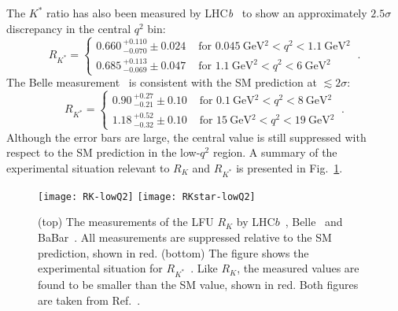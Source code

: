 The $K^{*}$ ratio has also been measured by LHC\textit{b}~\cite{Aaij:2017vbb} to
show an approximately $2.5 \sigma$ discrepancy in the central $q^{2}$ bin:
\begin{equation}
  \label{eq:ch1-RKstar-lhcb}
    R_{K^*} = \begin{cases}
     0.660\,_{-0.070}^{+0.110}\pm 0.024 & \text{ for $\SI{0.045}{\GeV^{2}} < q^2 < \SI{1.1}{\GeV^{2}}$} \\
    0.685\,_{-0.069}^{+0.113}\pm 0.047 & \text{ for $\SI{1.1}{\GeV^{2}} < q^2 < \SI{6}{\GeV^{2}}$}
  \end{cases} \ .
\end{equation}
The Belle measurement~\cite{Abdesselam:2019wac} is consistent with the SM
prediction at $\lesssim 2\sigma$:
\begin{equation}
  \label{eq:ch1-RKstar-belle}
    R_{K^*} = \begin{cases}
     0.90\,_{-0.21}^{+0.27} \pm 0.10 & \text{ for $\SI{0.1}{\GeV^{2}} < q^2 < \SI{8}{\GeV^{2}}$} \\
    1.18\,_{-0.32}^{+0.52} \pm 0.10 & \text{ for $\SI{15}{\GeV^{2}} < q^2 < \SI{19}{\GeV^{2}}$}
  \end{cases} \ .
\end{equation}
Although the error bars are large, the central value is still suppressed with
respect to the SM prediction in the low-$q^{2}$ region. A summary of the
experimental situation relevant to $R_{K}$ and $R_{K^{*}}$ is presented in
Fig.~\ref{fig:ch1-rkrkstar-summary}.

\begin{figure}
  \centering
  \texttt{[image: RK-lowQ2]}
  \texttt{[image: RKstar-lowQ2]}
  \caption[(top) The measurements of the LFU $R_{K}$ by
  LHC$b$~\cite{Aaij:2019wad}, Belle~\cite{Abdesselam:2019lab} and
  BaBar~\cite{Lees:2012tva}. (bottom) The figure shows the experimental
  situation for $R_{K^{*}}$~\cite{Lees:2012tva, Abdesselam:2019wac,
    Aaij:2017vbb}.]{(top) The measurements of the LFU $R_{K}$ by
    LHC$b$~\cite{Aaij:2019wad}, Belle~\cite{Abdesselam:2019lab} and
    BaBar~\cite{Lees:2012tva}. All measurements are suppressed relative to the
    SM prediction, shown in red. (bottom) The figure shows the experimental
    situation for $R_{K^{*}}$~\cite{Lees:2012tva, Abdesselam:2019wac,
      Aaij:2017vbb}. Like $R_{K}$, the measured values are found to be smaller
    than the SM value, shown in red. Both figures are taken from
    Ref.~\cite{Koppenburg:2016rji}.}
  \label{fig:ch1-rkrkstar-summary}
\end{figure}

